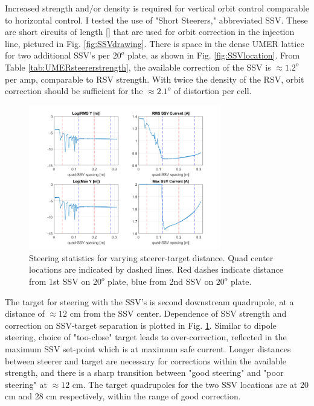 Increased strength and/or density is required for vertical orbit control comparable to horizontal control. I tested the use of "Short Steerers," abbreviated SSV. These are short circuits of length [] that are used for orbit correction in the injection line, pictured in Fig. \ref{fig:SSVdrawing}. There is space in the dense UMER lattice for two additional SSV's per $20^o$ plate, as shown in Fig. \ref{fig:SSVlocation}. From Table \ref{tab:UMERsteererstrength}, the available correction of the SSV is $\approx 1.2^o$ per amp, comparable to RSV strength. With twice the density of the RSV, orbit correction should be sufficient for the $\approx 2.1^o$ of distortion per cell.

\begin{figure}[]
\centering
\includegraphics[width=0.75\textwidth]{6.figures/SSV/steering_behaviour_vs_lever_arm_distance.png}
\caption{Steering statistics for varying steerer-target distance. Quad center locations are indicated by dashed lines. Red dashes indicate distance from 1st SSV on $20^o$ plate, blue from 2nd SSV on $20^o$ plate.}
\label{fig:lever_arm}
\end{figure}



The target for steering with the SSV's is second downstream quadrupole, at a distance of $\approx 12$ cm from the SSV center. Dependence of SSV strength and correction on SSV-target separation is plotted in Fig. \ref{fig:lever_arm}. Similar to dipole steering, choice of "too-close" target leads to over-correction, reflected in the maximum SSV set-point which is at maximum safe current. Longer distances between steerer and target are necessary for corrections within the available strength, and there is a sharp transition between "good steering" and "poor steering" at $\approx 12$ cm. The target quadrupoles for the two SSV locations are at 20 cm and 28 cm respectively, within the range of good correction.


